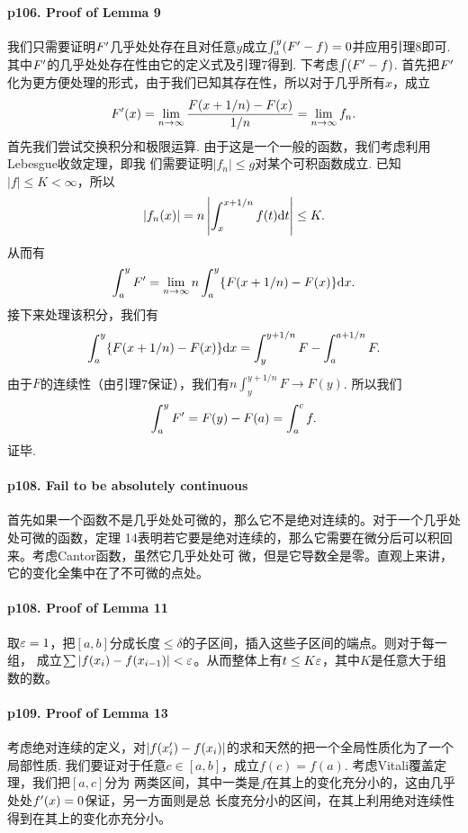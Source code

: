  \paragraph{p106. Proof of Lemma 9}
    我们只需要证明$F^\prime$几乎处处存在且对任意$y$成立$\int_a^y(F^\prime-f)=0$并应用引理8即可. 
    其中$F^\prime$的几乎处处存在性由它的定义式及引理7得到. 下考虑$\int(F^\prime-f)$. 首先把$F^\prime$
    化为更方便处理的形式，由于我们已知其存在性，所以对于几乎所有$x$，成立
    \[
      F^\prime(x) = \lim_{n\to\infty}\frac{F(x+1/n)-F(x)}{1/n}=\lim_{n\to\infty}f_n.
    \]
    首先我们尝试交换积分和极限运算. 由于这是一个一般的函数，我们考虑利用Lebesgue收敛定理，即我
    们需要证明$|f_n|\le g$对某个可积函数成立. 已知$|f|\le K<\infty$，所以
    \[
      |f_n(x)| = n\left|\int_x^{x+1/n}f(t)\mathrm{d} t\right| \le K.
    \]
    从而有
    \[
      \int_a^y F^\prime = \lim_{n\to\infty} n\int_a^y\{F(x+1/n)-F(x)\}\mathrm{d} x.
    \]
    接下来处理该积分，我们有
    \[
      \int_a^y\{F(x+1/n)-F(x)\}\mathrm{d} x = \int_y^{y+1/n}F - \int_a^{a+1/n}F.
    \]
    由于$F$的连续性（由引理7保证），我们有$n\int_y^{y+1/n}F\to F(y)$. 所以我们
    \[
      \int_a^y F^\prime = F(y)-F(a)=\int_a^c f.
    \]
    证毕.

  \paragraph{p108. Fail to be absolutely continuous}
    首先如果一个函数不是几乎处处可微的，那么它不是绝对连续的。对于一个几乎处处可微的函数，定理
    14表明若它要是绝对连续的，那么它需要在微分后可以积回来。考虑Cantor函数，虽然它几乎处处可
    微，但是它导数全是零。直观上来讲，它的变化全集中在了不可微的点处。

  \paragraph{p108. Proof of Lemma 11}
    取$\varepsilon=1$，把$[a,b]$分成长度$\le\delta$的子区间，插入这些子区间的端点。则对于每一组，
    成立$\sum|f(x_i)-f(x_{i-1})|<\varepsilon$。从而整体上有$t\le K\varepsilon$，其中$K$是任意大于组
    数的数。

  \paragraph{p109. Proof of Lemma 13}
    考虑绝对连续的定义，对$|f(x^\prime_i)-f(x_i)|$的求和天然的把一个全局性质化为了一个局部性质.
    我们要证对于任意$c\in[a,b]$，成立$f(c)=f(a)$. 考虑Vitali覆盖定理，我们把$[a,c]$分为
    两类区间，其中一类是$f$在其上的变化充分小的，这由几乎处处$f^\prime(x)=0$保证，另一方面则是总
    长度充分小的区间，在其上利用绝对连续性得到在其上的变化亦充分小。

